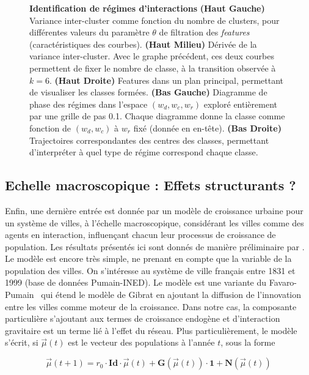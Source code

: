 \begin{figure}
\caption{\textbf{Identification de régimes d'interactions} \textbf{(Haut Gauche)} Variance inter-cluster comme fonction du nombre de clusters, pour différentes valeurs du paramètre $\theta$ de filtration des \emph{features} (caractéristiques des courbes). \textbf{(Haut Milieu)} Dérivée de la variance inter-cluster. Avec le graphe précédent, ces deux courbes permettent de fixer le nombre de classe, à la transition observée à $k=6$. \textbf{(Haut Droite)} Features dans un plan principal, permettant de visualiser les classes formées. \textbf{(Bas Gauche)} Diagramme de phase des régimes dans l'espace $(w_{d},w_{c},w_{r})$ exploré entièrement par une grille de pas 0.1. Chaque diagramme donne la classe comme fonction de $(w_d,w_c)$ à $w_r$ fixé (donnée en en-tête). \textbf{(Bas Droite)} Trajectoires correspondantes des centres des classes, permettant d'interpréter à quel type de régime correspond chaque classe.}
\label{fig:clustering}
\end{figure}






\subsection{Echelle macroscopique : Effets structurants ?}

Enfin, une dernière entrée est donnée par un modèle de croissance urbaine pour un système de villes, à l'échelle macroscopique, considérant les villes comme des agents en interaction, influençant chacun leur processus de croissance de population. Les résultats présentés ici sont donnés de manière préliminaire par \cite{raimbault2016models}. Le modèle est encore très simple, ne prenant en compte que la variable de la population des villes. On s'intéresse au système de ville français entre 1831 et 1999 (base de données Pumain-INED). Le modèle est une variante du Favaro-Pumain~\cite{favaro2011gibrat} qui étend le modèle de Gibrat en ajoutant la diffusion de l'innovation entre les villes comme moteur de la croissance. Dans notre cas, la composante particulière s'ajoutant aux termes de croissance endogène et d'interaction gravitaire est un terme lié à l'effet du réseau. Plus particulièrement, le modèle s'écrit, si $\vec{\mu}(t)$ est le vecteur des populations à l'année $t$, sous la forme

\begin{equation}
\vec{\mu}(t+1) = r_0\cdot \mathbf{Id}\cdot \vec{\mu}(t) + \mathbf{G}\left(\vec{\mu}(t)\right)\cdot \mathbf{1} + \mathbf{N}\left(\vec{\mu}(t)\right)
\end{equation}


